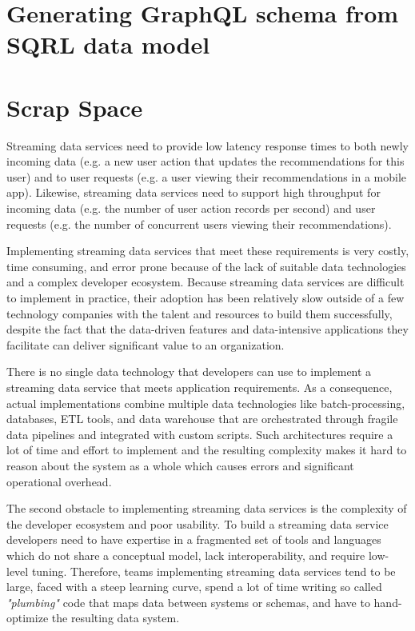 \documentclass[	DIV=calc,%
							paper=letter,%
							fontsize=11pt,%
							twocolumn]{scrartcl}	 					%
\begin{document}
\section{Generating GraphQL schema from SQRL data model}
\label{appendix:sqrl2graphql}


\section{Scrap Space}


Streaming data services need to provide low latency response times to both newly incoming data (e.g. a new user action that updates the recommendations for this user) and to user requests (e.g. a user viewing their recommendations in a mobile app). Likewise, streaming data services need to support high throughput for incoming data (e.g. the number of user action records per second) and user requests (e.g. the number of concurrent users viewing their recommendations).

Implementing streaming data services that meet these requirements is very costly, time consuming, and error prone because of the lack of suitable data technologies and a complex developer ecosystem. Because streaming data services are difficult to implement in practice, their adoption has been relatively slow outside of a few technology companies with the talent and resources to build them successfully, despite the fact that the data-driven features and data-intensive applications they facilitate can deliver significant value to an organization.

There is no single data technology that developers can use to implement a streaming data service that meets application requirements. As a consequence, actual implementations combine multiple data technologies like batch-processing, databases, ETL tools, and data warehouse that are orchestrated through fragile data pipelines and integrated with custom scripts. Such architectures require a lot of time and effort to implement and the resulting complexity makes it hard to reason about the system as a whole which causes errors and significant operational overhead.


The second obstacle to implementing streaming data services is the complexity of the developer ecosystem and poor usability. To build a streaming data service developers need to have expertise in a fragmented set of tools and languages which do not share a conceptual model, lack interoperability, and require low-level tuning. Therefore, teams implementing streaming data services tend to be large, faced with a steep learning curve, spend a lot of time writing so called \textit{"plumbing"} code that maps data between systems or schemas, and have to hand-optimize the resulting data system.
\end{document}
